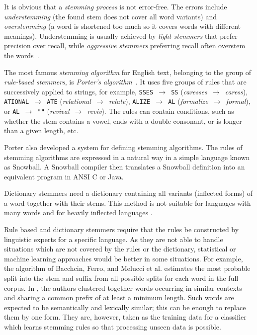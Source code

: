 It is obvious that a \textit{stemming process} is not error-free. The errors include 
\textit{understemming} (the found stem does not cover all word variants) and 
\textit{overstemming} (a word is shortened too much so it covers words with different meanings). 
Understemming is usually achieved by \textit{light stemmers} that prefer precision 
over recall, while \textit{aggressive stemmers} preferring recall often overstem 
the words~\cite{ref39}.

The most famous \textit{stemming algorithm} for English text, belonging to the 
group of \textit{rule-based stemmers}, is \textit{Porter’s algorithm}~\cite{ref217}. It uses five groups of 
rules that are successively applied to strings, for example, 
\texttt{SSES~$\rightarrow$~SS} (\textit{caresses~$\rightarrow$~caress}), 
\texttt{ATIONAL~$\rightarrow$~ATE} (\textit{relational~$\rightarrow$~relate}), 
\texttt{ALIZE~$\rightarrow$~AL} (\textit{formalize~$\rightarrow$~formal}), or 
\texttt{AL~$\rightarrow$~""} (\textit{revival~$\rightarrow$~reviv}). 
The rules can contain conditions, such as whether the stem contains a vowel, 
ends with a double consonant, or is longer than a given length, etc.

Porter \cite{ref218} also developed a system for defining stemming algorithms. The
rules of stemming algorithms are expressed in a natural way in a simple language
known as Snowball. A Snowball compiler then translates a Snowball definition
into an equivalent program in ANSI C or Java.

Dictionary stemmers need a dictionary containing all variants (inflected
forms) of a word together with their stems. This method is not suitable for languages with many words and for heavily inflected languages \cite{ref140}.

Rule based and dictionary stemmers require that the rules be constructed by
linguistic experts for a specific language. As they are not able to handle situations
which are not covered by the rules or the dictionary, statistical or machine learning approaches would be better in some situations. For example, the algorithm
of Bacchcin, Ferro, and Melucci et al. \cite{ref15} estimates the most probable split into
the stem and suffix from all possible splits for each word in the full corpus. In
\cite{ref39}, the authors clustered together words occurring in similar contexts and sharing a common prefix of at least a minimum length. Such words are expected to
be semantically and lexically similar; this can be enough to replace them by one form. They are, however, taken as the training data for a classifier which learns
stemming rules so that processing unseen data is possible.

